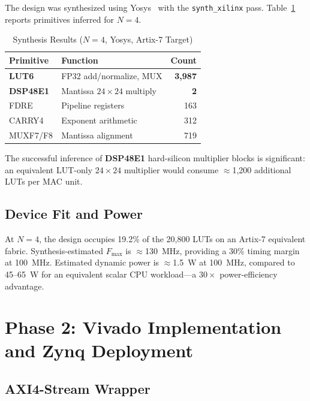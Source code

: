 \documentclass[journal,a4paper]{IEEEtran}
\begin{document}
The design was synthesized using Yosys~\cite{wolf2013} with the
\texttt{synth\_xilinx} pass. Table~\ref{tab:synth} reports primitives
inferred for $N=4$.

\begin{table}[!t]
\centering
\caption{Synthesis Results ($N=4$, Yosys, Artix-7 Target)}
\label{tab:synth}
\begin{tabular}{llr}
\toprule
Primitive & Function & Count \\
\midrule
\textbf{LUT6}    & FP32 add/normalize, MUX         & \textbf{3,987} \\
\textbf{DSP48E1} & Mantissa $24\!\times\!24$ multiply & \textbf{2} \\
FDRE             & Pipeline registers               & 163 \\
CARRY4           & Exponent arithmetic              & 312 \\
MUXF7/F8         & Mantissa alignment               & 719 \\
\bottomrule
\end{tabular}
\end{table}

The successful inference of \textbf{DSP48E1} hard-silicon multiplier
blocks is significant: an equivalent LUT-only $24\!\times\!24$ multiplier
would consume ${\approx}$1,200 additional LUTs per MAC unit.

\subsection{Device Fit and Power}

At $N=4$, the design occupies 19.2\% of the 20,800 LUTs on an Artix-7
equivalent fabric. Synthesis-estimated $F_{\max}$ is ${\approx}$130~MHz,
providing a 30\% timing margin at 100~MHz.
Estimated dynamic power is ${\approx}$1.5~W at 100~MHz, compared to
45--65~W for an equivalent scalar CPU workload---a $30\times$
power-efficiency advantage.

\section{Phase 2: Vivado Implementation and Zynq Deployment}

\subsection{AXI4-Stream Wrapper}
\end{document}
